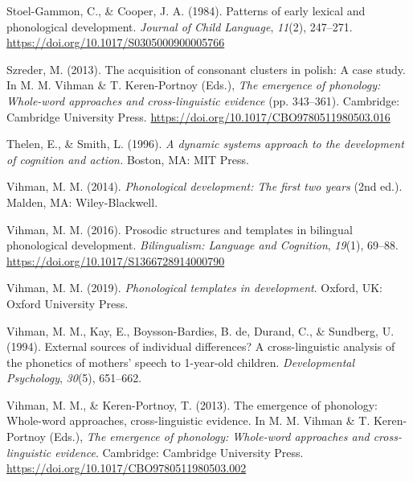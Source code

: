 \documentclass[
  man,mask,floatsintext]{apa6}
\newlength{\cslhangindent}
\newlength{\cslentryspacingunit} %
\newenvironment{CSLReferences}[2] %
 {%
  \setlength{\parindent}{0pt}
  \ifodd #1
  \let\oldpar\par
  \def\par{\hangindent=\cslhangindent\oldpar}
  \fi
  \setlength{\parskip}{#2\cslentryspacingunit}
 }%
 {}
\begin{document}
\begin{CSLReferences}{1}{0}
\leavevmode{}%
Stoel-Gammon, C., \& Cooper, J. A. (1984). Patterns of early lexical and phonological development. \emph{Journal of Child Language}, \emph{11}(2), 247--271. \url{https://doi.org/10.1017/S0305000900005766}

\leavevmode{}%
Szreder, M. (2013). The acquisition of consonant clusters in polish: A case study. In M. M. Vihman \& T. Keren-Portnoy (Eds.), \emph{The emergence of phonology: Whole-word approaches and cross-linguistic evidence} (pp. 343--361). Cambridge: Cambridge University Press. \url{https://doi.org/10.1017/CBO9780511980503.016}

\leavevmode{}%
Thelen, E., \& Smith, L. (1996). \emph{A dynamic systems approach to the development of cognition and action.} Boston, {MA}: {MIT} Press.

\leavevmode{}%
Vihman, M. M. (2014). \emph{Phonological development: The first two years} (2nd ed.). Malden, {MA}: Wiley-Blackwell.

\leavevmode{}%
Vihman, M. M. (2016). Prosodic structures and templates in bilingual phonological development. \emph{Bilingualism: Language and Cognition}, \emph{19}(1), 69--88. \url{https://doi.org/10.1017/S1366728914000790}

\leavevmode{}%
Vihman, M. M. (2019). \emph{Phonological templates in development}. Oxford, {UK}: Oxford University Press.

\leavevmode{}%
Vihman, M. M., Kay, E., Boysson-Bardies, B. de, Durand, C., \& Sundberg, U. (1994). External sources of individual differences? A cross-linguistic analysis of the phonetics of mothers' speech to 1-year-old children. \emph{Developmental Psychology}, \emph{30}(5), 651--662.

\leavevmode{}%
Vihman, M. M., \& Keren-Portnoy, T. (2013). The emergence of phonology: Whole-word approaches, cross-linguistic evidence. In M. M. Vihman \& T. Keren-Portnoy (Eds.), \emph{The emergence of phonology: Whole-word approaches and cross-linguistic evidence}. Cambridge: Cambridge University Press. \url{https://doi.org/10.1017/CBO9780511980503.002}


\end{CSLReferences}
\end{document}
